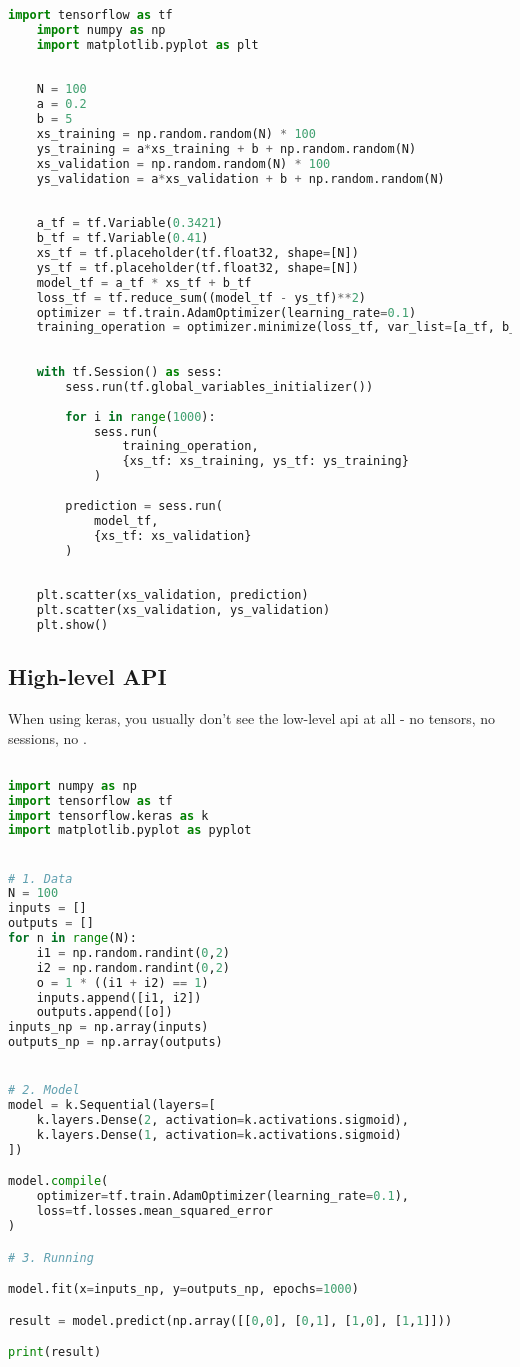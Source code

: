 \begin{lstlisting}[language=python]
    import tensorflow as tf
    import numpy as np
    import matplotlib.pyplot as plt
    
    
    N = 100
    a = 0.2
    b = 5
    xs_training = np.random.random(N) * 100
    ys_training = a*xs_training + b + np.random.random(N)
    xs_validation = np.random.random(N) * 100
    ys_validation = a*xs_validation + b + np.random.random(N)
    
    
    a_tf = tf.Variable(0.3421)
    b_tf = tf.Variable(0.41)
    xs_tf = tf.placeholder(tf.float32, shape=[N])
    ys_tf = tf.placeholder(tf.float32, shape=[N])
    model_tf = a_tf * xs_tf + b_tf
    loss_tf = tf.reduce_sum((model_tf - ys_tf)**2)
    optimizer = tf.train.AdamOptimizer(learning_rate=0.1)
    training_operation = optimizer.minimize(loss_tf, var_list=[a_tf, b_tf])
    
    
    with tf.Session() as sess:
        sess.run(tf.global_variables_initializer())
    
        for i in range(1000):
            sess.run(
                training_operation, 
                {xs_tf: xs_training, ys_tf: ys_training}
            )
    
        prediction = sess.run(
            model_tf, 
            {xs_tf: xs_validation}
        )
    
    
    plt.scatter(xs_validation, prediction)
    plt.scatter(xs_validation, ys_validation)
    plt.show()

\end{lstlisting}

\subsection{High-level API}

When using keras, you usually don't see the low-level api at all - no tensors, no sessions, no .

\begin{lstlisting}[language=python]

import numpy as np
import tensorflow as tf
import tensorflow.keras as k
import matplotlib.pyplot as pyplot


# 1. Data
N = 100
inputs = []
outputs = []
for n in range(N):
    i1 = np.random.randint(0,2)
    i2 = np.random.randint(0,2)
    o = 1 * ((i1 + i2) == 1)
    inputs.append([i1, i2])
    outputs.append([o])
inputs_np = np.array(inputs)
outputs_np = np.array(outputs)


# 2. Model
model = k.Sequential(layers=[
    k.layers.Dense(2, activation=k.activations.sigmoid),
    k.layers.Dense(1, activation=k.activations.sigmoid)
])

model.compile(
    optimizer=tf.train.AdamOptimizer(learning_rate=0.1),
    loss=tf.losses.mean_squared_error
)

# 3. Running

model.fit(x=inputs_np, y=outputs_np, epochs=1000)

result = model.predict(np.array([[0,0], [0,1], [1,0], [1,1]]))

print(result)



\end{lstlisting}